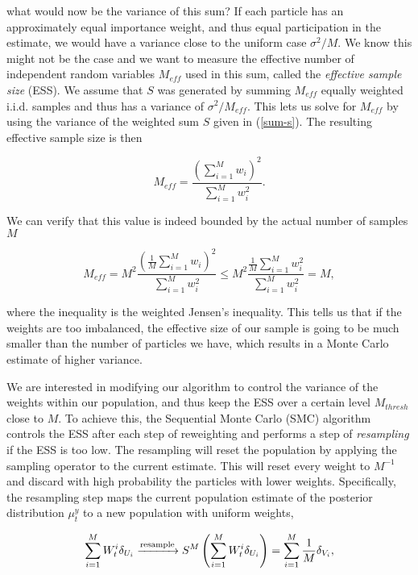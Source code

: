 what would now be the variance of this sum? If each particle has an approximately equal importance weight, and thus equal participation in the estimate, we would have a variance close to the uniform case $\sigma^2/M$. We know this might not be the case and we want to measure the effective number of independent random variables $M_{eff}$ used in this sum, called the \textit{effective sample size} (ESS). We assume that $S$ was generated by summing $M_{eff}$ equally weighted i.i.d. samples and thus has a variance of $\sigma^2/M_{eff}$. This lets us solve for $M_{eff}$ by using the variance of the weighted sum $S$ given in (\ref{sum-s}). The resulting effective sample size is then

\begin{equation}\label{ess}
  M_{eff} = \frac{\left(\sum_{i=1}^Mw_i\right)^2}{\sum_{i=1}^Mw_i^2}.
\end{equation}

We can verify that this value is indeed bounded by the actual number of samples $M$

\begin{equation*}
  M_{eff} = M^2\frac{\left(\frac1M\sum_{i=1}^Mw_i\right)^2}{\sum_{i=1}^Mw_i^2} \le M^2 \frac{\frac1M\sum_{i=1}^Mw_i^2}{\sum_{i=1}^Mw_i^2} = M,
\end{equation*}

where the inequality is the weighted Jensen's inequality. This tells us that if the weights are too imbalanced, the effective size of our sample is going to be much smaller than the number of particles we have, which results in a Monte Carlo estimate of higher variance.

We are interested in modifying our algorithm to control the variance of the weights within our population, and thus keep the ESS over a certain level $M_{thresh}$ close to $M$. To achieve this, the Sequential Monte Carlo (SMC) algorithm controls the ESS after each step of reweighting and performs a step of \textit{resampling} if the ESS is too low. The resampling will reset the population by applying the sampling operator to the current estimate. This will reset every weight to $M^{-1}$ and discard with high probability the particles with lower weights. Specifically, the resampling step maps the current population estimate of the posterior distribution $\mu^y_t$ to a new population with uniform weights,

\begin{equation*}
  \sum_{i=1}^MW^i_t\delta_{U_i} \xrightarrow{\text{resample}} S^M\left(\sum_{i=1}^MW^i_t\delta_{U_i}\right) = \sum_{i=1}^M\frac1M\delta_{V_i},
\end{equation*}

